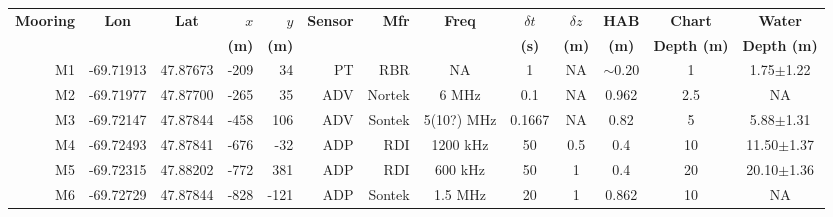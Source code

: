 \documentclass[letterpaper,10pt,landscape]{article}
\begin{document}
\thispagestyle{empty}



\begin{table}
  \centering
  \begin{tabular}{|r|c|c|r|r|r|r|c|c|c|c|c|c|} \hline
    {\bf Mooring}       & {\bf Lon}                  & {\bf Lat}                 & $x$                    & $y$                   & {\bf Sensor} &{\bf Mfr}   & {\bf Freq}&$\delta t$ &$\delta z$& {\bf HAB}  & {\bf Chart}        & {\bf Water}       \\
    ~                   &                            &                           & {\bf (m)}              & {\bf (m)}             &              &            &           & {\bf (s)} & {\bf (m)}& {\bf (m)}  & {\bf Depth (m)}    & {\bf Depth (m)}   \\\hline \hline
    M1                  & -69.71913                  & 47.87673                  & -209                   & 34                    & PT           & RBR        & NA        & 1         & NA       & $\sim0.20$ & 1                  &  1.75$\pm$1.22    \\\hline
    M2                  & -69.71977                  & 47.87700                  & -265                   & 35                    & ADV          & Nortek     & 6 MHz     & 0.1       & NA       & 0.962      & 2.5                &  NA               \\\hline %
    M3                  & -69.72147                  & 47.87844                  & -458                   & 106                   & ADV          & Sontek     & 5(10?) MHz& 0.1667    & NA       & 0.82       & 5                  &  5.88$\pm$1.31    \\\hline
    M4                  & -69.72493                  & 47.87841                  & -676                   & -32                   & ADP          & RDI        & 1200 kHz  & 50        & 0.5      & 0.4        & 10                 &  11.50$\pm$1.37   \\\hline
    M5                  & -69.72315                  & 47.88202                  & -772                   & 381                   & ADP          & RDI        & 600 kHz   & 50        & 1        & 0.4        & 20                 &  20.10$\pm$1.36   \\\hline
    \multirow{4}{*}{M6} & \multirow{4}{*}{-69.72729} & \multirow{4}{*}{47.87844} & \multirow{4}{*}{-828}  & \multirow{4}{*}{-121} & ADP          & Sontek     & 1.5 MHz   & 20        & 1        & 0.862      & \multirow{4}{*}{10}&  NA               \\ 

\end{tabular}
\end{table}
\end{document}
